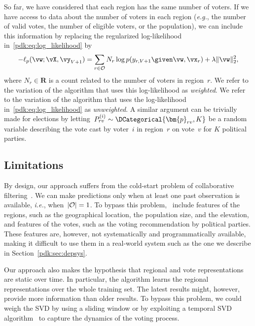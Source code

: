 So far, we have considered that each region has the same number of voters.
If we have access to data about the number of voters in each region (\textit{e.g.}, the number of valid votes, the number of eligible voters, or the population), we can include this information by replacing the regularized log-likelihood in~\eqref{pdk:eq:log_likelihood} by
\begin{equation}
	\label{pdk:eq:weighted}
	-\ell_p(\vw ; \vX, \vy_{V+1}) = \sum_{r \in \Obs} N_r \log p(y_{r,V+1} \given \vw, \vx_r) + \lambda \Vert \vw \Vert_2^2,
\end{equation}
where $N_r \in \mathbf{R}$ is a count related to the number of voters in region~$r$.
We refer to the variation of the algorithm that uses this log-likelihood as \textit{weighted}.
We refer to the variation of the algorithm that uses the log-likelihood in~\eqref{pdk:eq:log_likelihood} as \textit{unweighted}.
A similar argument can be trivially made for elections by letting~$P_{rv}^{(i)} \sim \DCategorical{\bm{p}_{rv}, K}$ be a random variable describing the vote cast by voter~$i$ in region~$r$ on vote~$v$ for $K$ political parties.

\subsection{Limitations}

By design, our approach suffers from the cold-start problem of collaborative filtering~\cite{koren2009matrix}.
We can make predictions only when at least one past observation is available, \textit{i.e.}, when~$\vert \mathcal{O} \vert = 1$.
To bypass this problem,~\citet{etter2016online} include features of the regions, such as the geographical location, the population size, and the elevation, and features of the votes, such as the voting recommendation by political parties.
These features are, however, not systematically and programmatically available, making it difficult to use them in a real-world system such as the one we describe in Section~\ref{pdk:sec:depsys}.

Our approach also makes the hypothesis that regional and vote representations are static over time.
In particular, the algorithm learns the regional representations over the whole training set.
The latest results might, however, provide more information than older results.
To bypass this problem, we could weigh the SVD by using a sliding window or by exploiting a temporal SVD algorithm~\cite{bamler2017dynamic} to capture the dynamics of the voting process.

